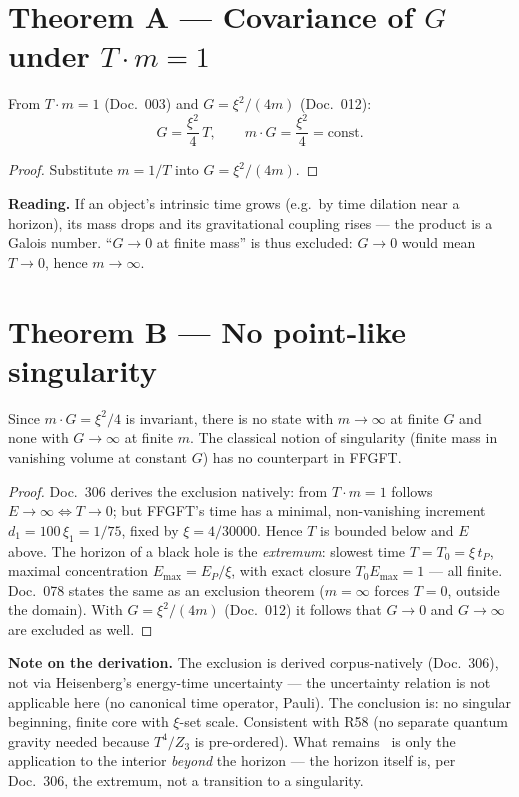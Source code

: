 \section{Theorem A --- Covariance of $G$ under $T\cdot m=1$}

\begin{theorem}
From $T\cdot m=1$ (Doc.~003) and $G=\xi^2/(4m)$ (Doc.~012):
\[
  G = \frac{\xi^2}{4}\,T, \qquad m\cdot G = \frac{\xi^2}{4}=\text{const.}
\]
\end{theorem}

\begin{proof}
Substitute $m=1/T$ into $G=\xi^2/(4m)$.
\end{proof}

\textbf{Reading.} If an object's intrinsic time grows (e.g.\ by time
dilation near a horizon), its mass drops and its gravitational coupling
rises --- the product is a Galois number. ``$G\to0$ at finite mass'' is thus
excluded: $G\to0$ would mean $T\to0$, hence $m\to\infty$.

\section{Theorem B --- No point-like singularity}

\begin{theorem}
Since $m\cdot G=\xi^2/4$ is invariant, there is no state with $m\to\infty$
at finite $G$ and none with $G\to\infty$ at finite $m$. The classical notion
of singularity (finite mass in vanishing volume at constant $G$) has no
counterpart in FFGFT.
\end{theorem}

\begin{proof}
Doc.~306 derives the exclusion natively: from $T\cdot m=1$ follows
$E\to\infty\Leftrightarrow T\to0$; but FFGFT's time has a minimal,
non-vanishing increment $d_1=100\,\xi_1=1/75$, fixed by $\xi=4/30000$.
Hence $T$ is bounded below and $E$ above. The horizon of a black hole is
the \emph{extremum}: slowest time $T=T_0=\xi\,t_P$, maximal concentration
$E_\text{max}=E_P/\xi$, with exact closure $T_0E_\text{max}=1$ --- all
finite. Doc.~078 states the same as an exclusion theorem ($m=\infty$
forces $T=0$, outside the domain). With $G=\xi^2/(4m)$ (Doc.~012) it
follows that $G\to0$ and $G\to\infty$ are excluded as well.
\end{proof}

\textbf{Note on the derivation.} The exclusion is derived corpus-natively
(Doc.~306), not via Heisenberg's energy-time uncertainty --- the uncertainty
relation is not applicable here (no canonical time operator, Pauli). The
conclusion is: no singular beginning, finite core with $\xi$-set scale. Consistent with R58 (no separate quantum gravity needed because
$T^4/Z_3$ is pre-ordered). What remains \SM\ is only the application to
the interior \emph{beyond} the horizon --- the horizon itself is, per
Doc.~306, the extremum, not a transition to a singularity.

